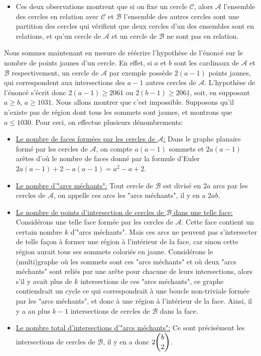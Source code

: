 \begin{sol}
\begin{itemize}
    \item Ces deux observations montrent que si on fixe un cercle $\mathcal{C}$, alors $\mathcal{A}$ l'ensemble des cercles en relation avec $\mathcal{C}$ et $\mathcal{B}$ l'ensemble des autres cercles sont une partition des cercles qui vérifient que deux cercles d'un des ensembles sont en relations, et qu'un cercle de $\mathcal{A}$ et un cercle de $\mathcal{B}$ ne sont pas en relation.
\end{itemize}

Nous sommes maintenant en mesure de réécrire l'hypothèse de l'énoncé sur le nombre de points jaunes d'un cercle. En effet, si $a$ et $b$ sont les cardinaux de $\mathcal{A}$ et $\mathcal{B}$ respectivement, un cercle de $\mathcal{A}$ par exemple possède $2(a-1)$ points jaunes, qui correspondent aux intersections des $a-1$ autres cercles de $\mathcal{A}$. L'hypothèse de l'énoncé s'écrit donc $2(a-1)\ge 2061$ ou $2(b-1)\ge 2061$, soit, en supposant $a\ge b$, $a\ge 1031$. Nous allons montrer que c'est impossible. Supposons qu'il n'existe pas de région dont tous les sommets sont jaunes, et montrons que $a\le 1030$. Pour ceci, on effectue plusieurs dénombrements:

\begin{itemize}
    \item \underline{Le nombre de faces formées par les cercles de $\mathcal{A}$:} Dans le graphe planaire formé par les cercles de $\mathcal{A}$, on compte $a(a-1)$ sommets et $2a(a-1)$ arêtes d'où le nombre de faces donné par la formule d'Euler $2a(a-1)+2-a(a-1) = a^2-a+2$.
    \item \underline{Le nombre d'"arcs méchants":} Tout cercle de $\mathcal{B}$ est divisé en $2a$ arcs par les cercles de $\mathcal{A}$, on appelle ces arcs les "arcs méchants", il y en a $2ab$.
    \item \underline{Le nombre de points d'intersection de cercles de $\mathcal{B}$ dans une telle face:} Considérons une telle face formée par les cercles de $\mathcal{A}$. Cette face contient un certain nombre $k$ d'"arcs méchants". Mais ces arcs ne peuvent pas s'intersecter de telle façon à former une région à l'intérieur de la face, car sinon cette région aurait tous ses sommets coloriés en jaune. Considérons le (multi)graphe où les sommets sont ces "arcs méchants" et où deux "arcs méchants" sont reliés par une arête pour chacune de leurs intersections, alors s'il y avait plus de $k$ intersections de ces "arcs méchants", ce graphe contiendrait un cycle ce qui correspondrait à une boucle non-triviale formée par les "arcs méchants", et donc à une région à l'intérieur de la face. Ainsi, il y a au plus $k-1$ intersections de cercles de $\mathcal{B}$ dans la face.
    \item \underline{Le nombre total d'intersections d'"arcs méchants":} Ce sont précisément les intersections de cercles de $\mathcal{B}$, il y en a donc $2\dbinom b2$.
\end{itemize}


\end{sol}
